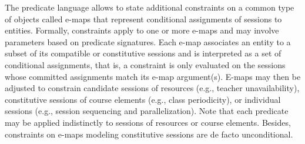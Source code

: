 The predicate language allows to state additional constraints %
on a common type of objects called e-maps 
that represent conditional assignments of sessions to entities. 
Formally, {\UTP} constraints apply to one or more e-maps and may involve parameters
based on predicate signatures. 
Each e-map associates an entity to a subset of its compatible or constitutive sessions 
and %
is interpreted as 
a set of conditional %
assignments, %
that is, 
a constraint is %
only 
evaluated on the sessions whose committed assignments match its e-map argument(s). 
E-maps may then be adjusted 
to constrain candidate sessions of resources (e.g., teacher unavailability), 
constitutive sessions of course elements (e.g., class periodicity), 
or individual sessions (e.g., session sequencing and parallelization).
Note that each predicate may be applied indistinctly to sessions of resources or course elements. 
Besides, constraints on e-maps modeling constitutive sessions are de facto 
unconditional. 

